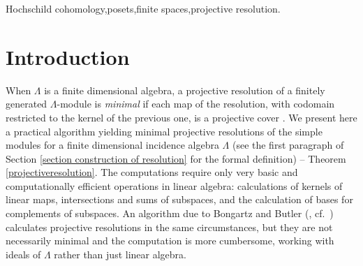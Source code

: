 \documentclass[preprint,review,12pt]{elsarticle}
\begin{document}
\begin{frontmatter}
%

\begin{keyword}
Hochschild cohomology\sep posets\sep finite spaces\sep projective resolution.

\end{keyword}

\end{frontmatter}



\label{sec1}
\section{Introduction}
When $\Lambda$ is a finite dimensional algebra, a projective resolution of a finitely generated $\Lambda$-module is \emph{minimal} if each map of the resolution, with codomain restricted to the kernel of the previous one, is a projective cover \cite[Definition I.5.7(b)]{ASS06}.  We present here a practical algorithm yielding minimal projective resolutions %
of the simple modules for a finite dimensional incidence algebra $\Lambda$ (see the first paragraph of Section \ref{section construction of resolution} for the formal definition)   -- Theorem \ref{projectiveresolution}.  The computations require only very basic and computationally efficient operations in linear algebra: calculations of kernels of linear maps, intersections and sums of subspaces, and the calculation of bases for complements of subspaces.  An algorithm due to Bongartz and Butler (\cite{B83}, cf.\ \cite[Proposition 3.5]{C89}) calculates projective resolutions in the same circumstances, but they are not necessarily minimal and the computation is more cumbersome, working with ideals of $\Lambda$ rather than just linear algebra.  
\end{document}

